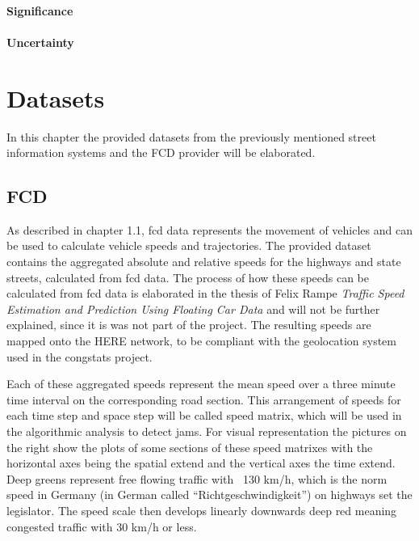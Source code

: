 \documentclass[a4paper,12pt]{report}
\begin{document}


\subsubsection{Significance}
\subsubsection{Uncertainty}
	
\chapter{Datasets}
In this chapter the provided datasets from the previously mentioned street information systems and the FCD provider will be elaborated. 

\section{FCD}
\label{dataset_fcd}
As described in chapter 1.1, \acrshort{fcd} data represents the movement of vehicles and can be used to calculate vehicle speeds and trajectories. The provided dataset contains the aggregated absolute and relative speeds for the highways and state streets, calculated from \acrshort{fcd} data. The process of how these speeds can be calculated from \acrshort{fcd} data is elaborated in the thesis of Felix Rampe \textit{Traffic Speed Estimation and Prediction Using Floating Car Data} \cite{Rempe2018} and will not be further explained, since it is was not part of the project. The resulting speeds are mapped onto the HERE \cite{HERE2020} network, to be compliant with the geolocation system used in the \gls{congstats} project.

Each of these aggregated speeds represent the mean speed over a three minute time interval on the corresponding road section. This arrangement of speeds for each time step and space step will be called speed matrix, which will be used in the algorithmic analysis to detect jams. For visual representation the pictures on the right show the plots of some sections of these speed matrixes with the horizontal axes being the spatial extend and the vertical axes the time extend. Deep greens represent free flowing traffic with ~130 km/h, which is the norm speed in Germany (in German called “Richtgeschwindigkeit”) on highways set the legislator. The speed scale then develops linearly downwards deep red meaning congested traffic with 30 km/h or less. 
\end{document}

